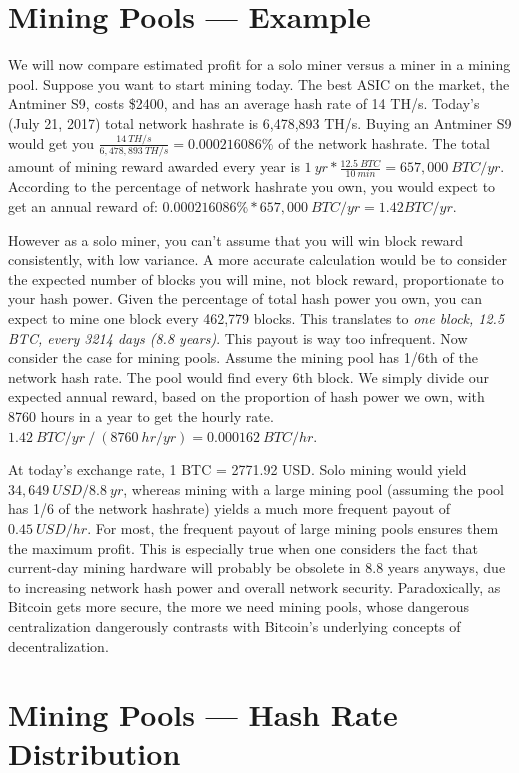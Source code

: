 \documentclass[full.tex]{subfiles}
\begin{document}
    \section*{Mining Pools --- Example}
    
    We will now compare estimated profit for a solo miner versus a miner in a mining pool. Suppose you want to start mining today. The best ASIC on the market, the Antminer S9, costs \$2400, and has an average hash rate of 14 TH/s. Today's (July 21, 2017) total network hashrate is 6,478,893 TH/s. Buying an Antminer S9 would get you $\frac{14~TH/s}{6,478,893~TH/s} = 0.000216086\%$ of the network hashrate. The total amount of mining reward awarded every year is $1~yr * \frac{12.5~BTC}{10~min} = 657,000~BTC/yr$. According to the percentage of network hashrate you own, you would expect to get an annual reward of: $0.000216086\% * 657,000~BTC/yr = 1.42 BTC/yr$. 
    
    However as a solo miner, you can't assume that you will win block reward consistently, with low variance. A more accurate calculation would be to consider the expected number of blocks you will mine, not block reward, proportionate to your hash power. Given the percentage of total hash power you own, you can expect to mine one block every 462,779 blocks. This translates to \textit{one block, 12.5 BTC, every 3214 days (8.8 years)}. This payout is way too infrequent. Now consider the case for mining pools. Assume the mining pool has 1/6th of the network hash rate. The pool would find every 6th block. We simply divide our expected annual reward, based on the proportion of hash power we own, with 8760 hours in a year to get the hourly rate. $1.42~BTC/yr~/~(8760~hr/yr) = 0.000162~BTC/hr$. 
    
    At today's exchange rate, 1 BTC = 2771.92 USD. Solo mining would yield $34,649~USD/8.8~yr$, whereas mining with a large mining pool (assuming the pool has 1/6 of the network hashrate) yields a much more frequent payout of $0.45~USD/hr$. For most, the frequent payout of large mining pools ensures them the maximum profit. This is especially true when one considers the fact that current-day mining hardware will probably be obsolete in 8.8 years anyways, due to increasing network hash power and overall network security. Paradoxically, as Bitcoin gets more secure, the more we need mining pools, whose dangerous centralization dangerously contrasts with Bitcoin's underlying concepts of decentralization.
    
    
    \section*{Mining Pools --- Hash Rate Distribution}
\end{document}

